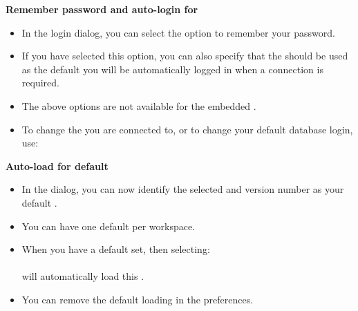\textbf{Remember password and auto-login for \gddb{}}
\begin{itemize}
\item In the \gddb{} login dialog, you can select the option to remember your password. 
\item If you have selected this option, you can also specify that the \gddb{} should be used as the default \gddb{} you will be automatically logged in when a \gddb{} connection is required. 
\item The above options are not available for the embedded \gddb{}.
\item To change the \gddb{} you are connected to, or to change your default database login, use:\\
\end{itemize}

\textbf{Auto-load for default \gdproject{}}
\begin{itemize}
\item In the  dialog, you can now identify the selected \gdproject{} and version number as your default \gdproject{}.
\item You can have one default \gdproject{} per workspace. 
\item When you have a default \gdproject{} set, then selecting:\\
\\
will automatically load this \gdproject{}.
\item You can remove the default loading in the  preferences. 
\end{itemize}
